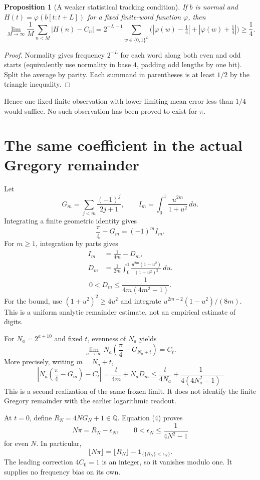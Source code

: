 \documentclass[10pt,a4paper]{article}
\newtheorem{proposition}[theorem]{Proposition}
\newcommand{\Q}{\mathbb Q}\newcommand{\R}{\mathbb R}
\newcommand{\fracp}[1]{\{#1\}}
\newcommand{\av}[2]{\frac1{#1}\sum_{n<#1}#2}
\begin{document}
\begin{proposition}[A weaker statistical tracking condition]
If $b$ is normal and $H(t)=\varphi(b[t:t+L])$ for a fixed finite-word function $\varphi$, then
\[
 \lim_{M\to\infty}\av{M}{|H(n)-C_n|}
 =2^{-L-1}\sum_{w\in\{0,1\}^L}
 \bigl(|\varphi(w)-\tfrac14|+|\varphi(w)+\tfrac14|\bigr)
 \ge\frac14.                                                   \tag{3}
\]
\end{proposition}
\begin{proof}
Normality gives frequency $2^{-L}$ for each word along both even and odd starts (equivalently use normality in base $4$, padding odd lengths by one bit). Split the average by parity. Each summand in parentheses is at least $1/2$ by the triangle inequality.
\end{proof}
Hence one fixed finite observation with lower limiting mean error less than $1/4$ would suffice. No such observation has been proved to exist for $\pi$.

\newpage
\section{The same coefficient in the actual Gregory remainder}
Let
\[
 G_m=\sum_{j<m}\frac{(-1)^j}{2j+1},\qquad
 I_m=\int_0^1\frac{u^{2m}}{1+u^2}\,du.
\]
Integrating a finite geometric identity gives
\[
 \frac\pi4-G_m=(-1)^m I_m.
\]
For $m\ge1$, integration by parts gives
\begin{align*}
 I_m&=\frac1{4m}-D_m,\\
 D_m&=\frac1{2m}\int_0^1
       \frac{u^{2m}(1-u^2)}{(1+u^2)^2}\,du.
\end{align*}
\[
 0<D_m\le\frac1{4m(4m^2-1)}.                              \tag{4}
\]
For the bound, use $(1+u^2)^2\ge4u^2$ and integrate
$u^{2m-2}(1-u^2)/(8m)$. This is a uniform analytic remainder estimate, not an empirical estimate of digits.

For $N_a=2^{a+10}$ and fixed $t$, evenness of $N_a$ yields
\[
 \boxed{\lim_{a\to\infty}N_a\left(\frac\pi4-G_{N_a+t}\right)=C_t.} \tag{5}
\]
More precisely, writing $m=N_a+t$,
\[
 \left|N_a\left(\frac\pi4-G_m\right)-C_t\right|
 =\frac{t}{4m}+N_aD_m
 \le\frac{t}{4N_a}+\frac1{4(4N_a^2-1)}.
\]
This is a second realization of the same frozen limit. It does not identify the finite Gregory remainder with the earlier logarithmic readout.

At $t=0$, define $R_N=4NG_N+1\in\Q$. Equation (4) proves
\[
 \boxed{N\pi=R_N-\epsilon_N,\qquad
 0<\epsilon_N\le\frac1{4N^2-1}}                              \tag{6}
\]
for even $N$. In particular,
\[
 \lfloor N\pi\rfloor=\lfloor R_N\rfloor
       -\mathbf1_{\{\fracp{R_N}<\epsilon_N\}}.
\]
The leading correction $4C_0=1$ is an integer, so it vanishes modulo one. It supplies no frequency bias on its own.
\end{document}
